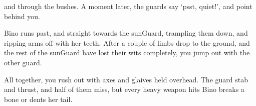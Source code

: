 and through the bushes.
A moment later, the \glspl{guard} say `psst, quiet!', and point behind you.

Bino runs past, and straight towards the \gls{sunGuard}, trampling them down, and ripping arms off with her teeth.
After a couple of limbs drop to the ground, and the rest of the \gls{sunGuard} have lost their wits completely, you jump out with the other \gls{guard}.

All together, you rush out with axes and glaives held overhead.
The \gls{guard} stab and thrust, and half of them miss, but every heavy weapon hits Bino breaks a bone or dents her tail.

